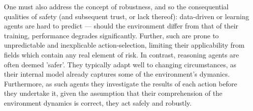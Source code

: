 \newline \newline
One must also address the concept of robustness, and so the consequential qualities of safety (and subsequent trust, or lack thereof): data-driven or learning agents are hard to predict --- should the environment differ from that of their training, performance degrades significantly. 
Further, such are prone to unpredictable and inexplicable action-selection, limiting their applicability from fields which contain any real element of risk. In contrast, reasoning agents are often deemed 'safer'. 
They typically adapt well to changing circumstances, as their internal model already captures some of the environment's dymanics. 
Furthermore, as such agents they investigate the results of each action before they undertake it, given the assumption that their comprehension of the environment dynamics is correct, they act safely and robustly.




